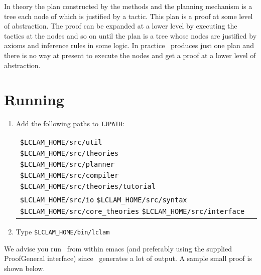 In theory the plan constructed by the methods and the planning
mechanism is a tree each node of
which is justified by a tactic.  This plan is a proof at
some level of abstraction.  The proof can be expanded at a lower level
by executing the tactics at the nodes and so on until the plan is a
tree whose nodes are justified by axioms and inference rules in some
logic.  In practice \lclam\ produces just one plan and there is no way
at present to execute the nodes and get
a proof at a lower level of abstraction.

\section{Running \lclam}

\begin{enumerate}
\item  Add the following paths to {\tt TJPATH}:

  \begin{tabular}{l}
  {\verb+$LCLAM_HOME/src/util+} \\
  {\verb+$LCLAM_HOME/src/theories+} \\
  {\verb+$LCLAM_HOME/src/planner+} \\
  {\verb+$LCLAM_HOME/src/compiler+} \\
  {\verb+$LCLAM_HOME/src/theories/tutorial+} \\
  {\verb+$LCLAM_HOME/src/io+}
  {\verb+$LCLAM_HOME/src/syntax+}
  {\verb+$LCLAM_HOME/src/core_theories+}
  {\verb+$LCLAM_HOME/src/interface+}
\end{tabular}

\item Type \verb+$LCLAM_HOME/bin/lclam+
\end{enumerate}

We advise you run \lclam\ from within emacs (and preferably using the
supplied ProofGeneral interface) since \lclam\ generates a lot of
output.  A sample small proof is shown below.

